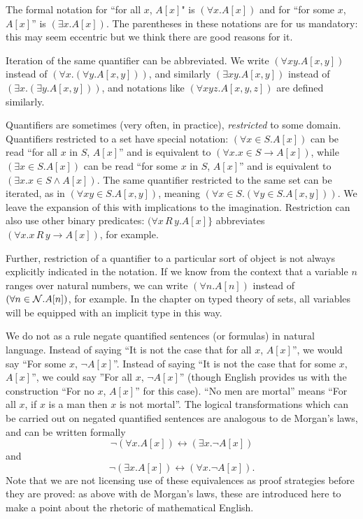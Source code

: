 \documentclass[12pt]{book}
\begin{document}
The formal notation for ``for all $x$, $A[x]$" is $(\forall x.A[x])$
and for ``for some $x$, $A[x]$'' is $(\exists x.A[x])$.  The
parentheses in these notations are for us mandatory: this may seem
eccentric but we think there are good reasons for it.

Iteration of the same quantifier can be abbreviated.  We write
$(\forall xy.A[x,y])$ instead of $(\forall x.(\forall y.A[x,y]))$, and
similarly $(\exists xy.A[x,y])$ instead of $(\exists x.(\exists
y.A[x,y]))$, and notations like $(\forall xyz.A[x,y,z])$ are defined
similarly.

Quantifiers are sometimes (very often, in practice), {\em
restricted\/} to some domain.  Quantifiers restricted to a set have
special notation: $(\forall x\in S.A[x])$ can be read ``for all $x$ in
$S$, $A[x]$'' and is equivalent to $(\forall x.x\in S \rightarrow
A[x])$, while $(\exists x\in S.A[x])$ can be read ``for some $x$ in
$S$, $A[x]$'' and is equivalent to $(\exists x.x\in S \wedge A[x])$.
The same quantifier restricted to the same set can be iterated, as in
$(\forall xy\in S.A[x,y])$, meaning $(\forall x \in S.(\forall y \in S.A[x,y]))$.  We leave the expansion of this with implications to the imagination.
Restriction can also use other binary predicates:  $(\forall x \, R \, y. A[x]\}$ abbreviates $(\forall x.x \, R \, y \rightarrow A[x])$, for example.

Further, restriction of a quantifier to a particular sort of object is
not always explicitly indicated in the notation.  If we know from the
context that a variable $n$ ranges over natural numbers, we can write
$(\forall n.A[n])$ instead of $(\forall n \in {\cal N}.A[n])$, for
example.  In the chapter on typed theory of sets, all variables will
be equipped with an implicit type in this way.

We do not as a rule negate quantified sentences (or formulas) in
natural language.  Instead of saying ``It is not the case that for all
$x$, $A[x]$'', we would say ``For some $x$, $\neg A[x]$''.  Instead of
saying ``It is not the case that for some $x$, $A[x]$'', we could say
''For all $x$, $\neg A[x]$'' (though English provides us with the
construction ``For no $x$, $A[x]$'' for this case).  ``No men are
mortal'' means ``For all $x$, if $x$ is a man then $x$ is not
mortal''.  The logical transformations which can be carried out on
negated quantified sentences are analogous to de Morgan's laws, and
can be written formally $$\neg(\forall x.A[x]) \leftrightarrow (\exists x.\neg
A[x])$$ and $$\neg(\exists x.A[x]) \leftrightarrow (\forall x.\neg A[x]).$$ Note
that we are not licensing use of these equivalences as proof strategies
before they are proved: as above with de Morgan's laws, these are
introduced here to make a point about the rhetoric of mathematical
English.
\end{document}
